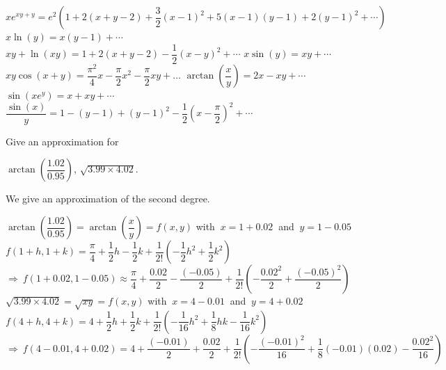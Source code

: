 \begin{Answer}
    
    \Question $x e^{xy+y} = e^2\left(1+2(x+y-2)+\dfrac{3}{2}(x-1)^2+5(x-1)(y-1)+2(y-1)^2 +\cdots\right)$
    \Question $x\ln (y) = x(y-1) + \cdots$
    \Question $xy+\ln (xy) = 1+2(x+y-2)-\dfrac{1}{2}\left(x-y\right)^2 +\cdots$
    \Question $x\sin (y) = xy + \cdots$
    \Question $xy\cos(x+y) = \dfrac{\pi^2}{4}x -\dfrac{\pi}{2}x^2 - \dfrac{\pi}{2}xy + \ldots $
    \ifanalysis
    \Question $\arctan \left(\dfrac{x}{y} \right) = 2x-xy+\cdots$
    \Question $\sin(xe^y) = x + xy + \cdots$ 
    \Question $\dfrac{\sin(x)}{y} = 1 - (y-1) + (y-1)^2 - \dfrac{1}{2}\left(x-\dfrac{\pi}{2}\right)^2+\cdots $
    \fi
    
    
\end{Answer}

\ifanalysis
\begin{Exercise}[difficulty = 3] Give an approximation for
\begin{multicols}{2}
    \Question $\arctan \left(\dfrac{1.02}{0.95}\right)$,
    \Question $\sqrt{3.99 \times 4.02}$.
    \EndCurrentQuestion
\end{multicols}
\end{Exercise}

\begin{Answer}
    We give an approximation of the second degree.
    
        \Question $\arctan \left( \dfrac{1.02}{0.95} \right) = \arctan \left( \dfrac{x}{y} \right)  = f(x,y)$ \quad with $\ x=1+0.02\ $ and $\ y=1-0.05$ \\[0.2cm]
        $f(1+h,1+k) = \dfrac{\pi}{4} + \dfrac{1}{2}h - \dfrac{1}{2}k + \dfrac{1}{2!} \left( -\dfrac{1}{2}h^2 + \dfrac{1}{2}k^2 \right)   $ \\[0.2cm]
        $\Rightarrow \ f(1+0.02,1-0.05) \approx \dfrac{\pi}{4} + \dfrac{ 0.02}{2} - \dfrac{(-0.05) }{2} + \dfrac{1}{2!} \left( -\dfrac{0.02^2}{2} + \dfrac{(-0.05)^2}{2} \right) $
        \Question $\sqrt{3.99 \times 4.02} = \sqrt{xy}=f(x,y)$ \quad with $\ x=4-0.01\ $ and $\ y=4+0.02$ \\[0.2cm]
         $f(4+h,4+k) = 4 + \dfrac{1}{2}h + \dfrac{1}{2}k + \dfrac{1}{2!} \left( -\dfrac{1}{16}h^2 + \dfrac{1}{8}hk - \dfrac{1}{16}k^2 \right)  $\\[0.2cm]
        $\Rightarrow \ f(4-0.01,4+0.02) = 4 + \dfrac{(-0.01)}{2} + \dfrac{0.02}{2} + \dfrac{1}{2!} \left( -\dfrac{(-0.01)^2}{16} + \dfrac{1}{8}(-0.01)(0.02) - \dfrac{0.02^2}{16} \right) $
        
    
\end{Answer}
\fi

